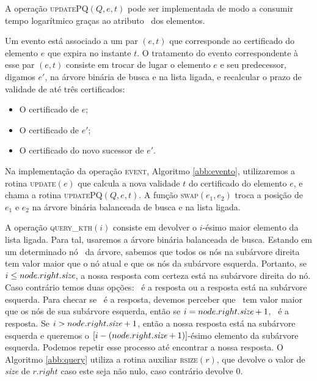 A operação \textsc{updatePQ}$(Q,e,t)$ pode ser implementada de modo
a consumir tempo logarítmico graças ao atributo \pqpos~dos
elementos.

Um evento está associado a um par $(e, t)$ que corresponde ao
certificado do elemento $e$ que expira no instante $t$. O tratamento
do evento correspondente à esse par $(e, t)$ consiste em trocar de
lugar o elemento $e$ e seu predecessor, digamos $e'$, na árvore
binária de busca e na lista ligada, e recalcular o prazo de validade
de até três certificados:

\begin{itemize}
    \item O certificado de $e$;
    \item O certificado de $e'$;
    \item O certificado do novo sucessor de $e'$.
\end{itemize}

Na implementação da operação \textsc{event}, Algoritmo
\ref{abb:evento}, utilizaremos a rotina \textsc{update}$(e)$ que
calcula a nova validade $t$ do certificado do elemento $e$, e chama
a rotina \textsc{updatePQ}$(Q, e, t)$. A função \textsc{swap}$(e_1,
e_2)$ troca a posição de $e_1$ e $e_2$ na árvore binária balanceada
de busca e na lista ligada.









A operação \textsc{query\_kth}$(i)$ consiste em devolver o $i$-ésimo
maior elemento da lista ligada. Para tal, usaremos a árvore binária
balanceada de busca. Estando em um determinado nó \no~da árvore,
sabemos que todos os nós na subárvore direita tem valor maior que o
nó atual e que os nós da subárvore esquerda. Portanto, se $i \leq
node.right.\textit{size}$, a nossa resposta com certeza está na
subárvore direita do nó. Caso contrário temos duas opções: \no~é a
resposta ou a resposta está na subárvore esquerda. Para checar se
\no~é a resposta, devemos perceber que \no~tem valor maior que os nós
de sua subárvore esquerda, então se $i = node.right.\textit{size} + 1$,
\no~é a resposta. Se $i > node.right.\textit{size} + 1$, então a nossa
resposta está na subárvore esquerda e queremos o $[i -
(node.right.\textit{size} + 1)]$-ésimo elemento da subárvore esquerda.
Podemos repetir esse processo até encontrar a nossa resposta. O
Algoritmo \ref{abb:query} utiliza a rotina auxiliar
\textsc{rsize}$(r)$, que devolve o valor de \textit{size} de
$r.right$ caso este seja não nulo, caso contrário devolve $0$.

